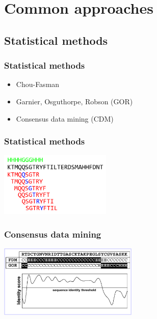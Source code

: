 \documentclass{beamer}
\begin{document}
\section{Common approaches}
\subsection{Statistical methods}
\begin{frame}
  \frametitle{Statistical methods}
  \begin{itemize}
    \item Chou-Fasman
    \item Garnier, Osguthorpe, Robson (GOR)
    \item Consensus data mining (CDM)
  \end{itemize}
\end{frame}
\begin{frame}
  \frametitle{Statistical methods}
  \begin{center}
    \includegraphics[width=200px]{windows.png}
  \end{center}
\end{frame}
\begin{frame}
  \frametitle{Consensus data mining}
  \begin{center}
    \includegraphics[width=250px]{cdm.png}
  \end{center}
\end{frame}
\end{document}
